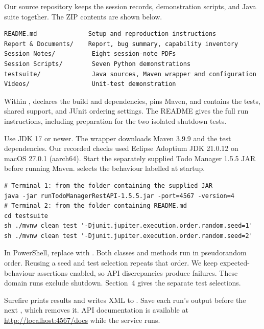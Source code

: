 \documentclass[12pt,letterpaper]{article}
\newcommand{\SuiteFolder}{\href{../testsuite/}{\Path{testsuite/}}}
\begin{document}
\NewContentPage
{}
\edef\PackageFirstPage{\number\value{page}}

Our source repository keeps the session records, demonstration scripts, and
Java suite together. The ZIP contents are shown below.
\begin{lstlisting}
README.md              Setup and reproduction instructions
Report & Documents/    Report, bug summary, capability inventory
Session Notes/          Eight session-note PDFs
Session Scripts/        Seven Python demonstrations
testsuite/              Java sources, Maven wrapper and configuration
Videos/                 Unit-test demonstration
\end{lstlisting}
Within \SuiteFolder,  declares the build and dependencies,
 pins Maven, and  contains the tests,
shared support, and JUnit ordering settings. The README gives the full run
instructions, including preparation for the two isolated shutdown tests.

Use JDK 17 or newer. The wrapper downloads Maven 3.9.9 and the test dependencies.
Our recorded checks used Eclipse Adoptium JDK 21.0.12 on macOS 27.0.1 (aarch64).
Start the separately supplied Todo Manager 1.5.5 JAR before running Maven.
 selects the behaviour labelled  at startup.
\begin{lstlisting}
# Terminal 1: from the folder containing the supplied JAR
java -jar runTodoManagerRestAPI-1.5.5.jar -port=4567 -version=4
# Terminal 2: from the folder containing README.md
cd testsuite
sh ./mvnw clean test '-Djunit.jupiter.execution.order.random.seed=1'
sh ./mvnw clean test '-Djunit.jupiter.execution.order.random.seed=2'
\end{lstlisting}
In PowerShell, replace  with .
Both classes and methods run in pseudorandom order. Reusing a seed and test
selection repeats that order. We keep expected-behaviour assertions enabled,
so API discrepancies produce failures. These domain runs exclude shutdown.
Section~4 gives the separate test selections.

Surefire prints results and writes XML to
. Save each run's output before the next
, which removes it. API documentation is available at
\url{http://localhost:4567/docs} while the service runs.
\end{document}
